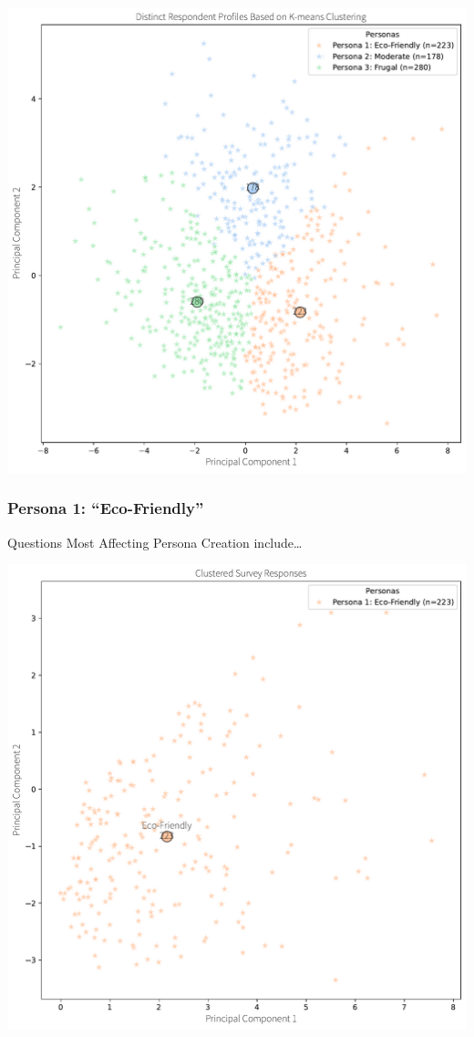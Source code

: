 \documentclass[
  letterpaper,
  DIV=11,
  numbers=noendperiod]{scrartcl}
\begin{document}
\includegraphics{_thesis_files/figure-pdf/cell-24-output-1.pdf}

\subsubsection{Persona 1:
``Eco-Friendly''}\label{persona-1-eco-friendly}

Questions Most Affecting Persona Creation include\ldots{}

\includegraphics{_thesis_files/figure-pdf/cell-25-output-1.pdf}
\end{document}
